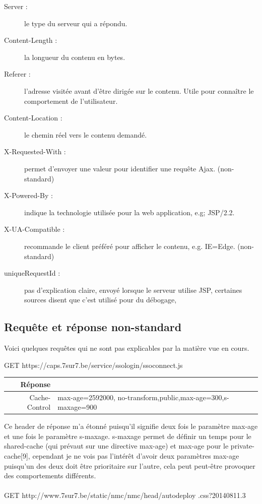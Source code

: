 \documentclass[conference]{IEEEtran}
\begin{document}
\begin{description}
 \item[Server : ] le type du serveur qui a répondu.
 \item[Content-Length : ] la longueur du contenu en bytes.
 \item[Referer : ] l'adresse visitée avant d'être dirigée sur le contenu. Utile pour connaître le comportement de l'utilisateur.
 \item[Content-Location : ] le chemin réel vers le contenu demandé.
 \item[X-Requested-With : ] permet d'envoyer une valeur pour identifier une requête Ajax. (non-standard)
 \item[X-Powered-By : ] indique la technologie utilisée pour la web application, e.g; JSP/2.2. 
 \item[X-UA-Compatible : ] recommande le client préféré pour afficher le contenu, e.g. IE=Edge. (non-standard) 
 \item[uniqueRequestId : ] pas d'explication claire, envoyé lorsque le serveur utilise JSP, certaines sources disent que c'est utilisé pour du débogage, 
\end{description}

\subsection{Requête et réponse non-standard}

Voici quelques requêtes qui ne sont pas explicables par la matière vue en cours.

GET https://caps.7sur7.be/service/ssologin/ssoconnect.js
\begin{tabular}{|r|p{5cm}|}
  \hline
  Réponse & \\
  \hline
  Cache-Control & max-age=2592000, no-transform,public,max-age=300,s-maxage=900 \\
  \hline
\end{tabular}

Ce header de réponse m'a étonné puisqu'il signifie deux fois le paramètre max-age et une fois le paramètre s-maxage. s-maxage permet de définir un temps pour le shared-cache (qui prévaut sur une directive max-age) et max-age pour le private-cache[9], cependant je ne vois pas l'intérêt d'avoir deux paramètres max-age puisqu'un des deux doit être prioritaire sur l'autre, cela peut peut-être provoquer des comportements différents. \\
\\

GET http://www.7sur7.be/static/nmc/nmc/head/autodeploy .css?20140811.3 \\
\end{document}
